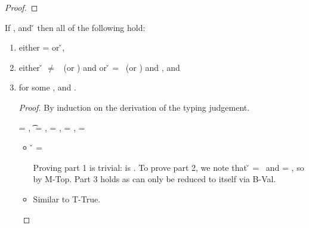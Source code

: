  \label{lemma:delta}
\begin{lemma}[Const]
\begin{proof}
\end{proof}
\end{lemma}

\begin{lemma}
If \judgement{\propenv{}}{\hastype{\e{}}{\t{}}}{\filterset{\thenprop{\prop{}}}{\elseprop{\prop{}}}}{\object{}},
\satisfies{\openv{}}{\propenv{}} 
and \opsem {\openv{}} {\e{}} {\v{}} 
then all of the following hold:
\begin{enumerate}
  \item either \object{} = \emptyobject{} or \inopenv {\openv{}} {\object{}} {\v{}},
  \item either \v{} $\not=$ \false\ (or \nil) and {\satisfies{\openv{}}{\thenprop{\prop{}}}} or 
               \v{}       = \false\ (or \nil) and {\satisfies{\openv{}}{\elseprop{\prop{}}}}, and
  \item \judgement{}{\hastype{\v{}}{\t{}}}{\filterset{\thenprop{\propp{}}}{\elseprop{\propp{}}}}{\objectp{}}
        for some \thenprop{\propp{}}, \elseprop{\propp{}} and {\objectp{}}.

\begin{proof}
By induction on the derivation of the typing judgement.

\begin{case}[T-True]
\e{} = \true, \t{} = \True, \thenprop{\prop{}} = \topprop{}, \elseprop{\prop{}} = \botprop{}, \object{} = \emptyobject{}

\begin{itemize}
  \item[] 
    \begin{subcase}[B-Val]
      \v{} = \true{}

Proving part 1 is trivial: \object{} is \emptyobject. 
To prove part 2, we note that \v{} = \true\ 
and \thenprop{\prop{}} = \topprop{}, so \satisfies{\openv{}}{\thenprop{\prop{}}} by M-Top.
Part 3 holds as \e{} can only be reduced to itself via B-Val.
\end{subcase}

\end{itemize}

\begin{case}[T-EmptyMap]

  \begin{itemize}
    \item[]
      \begin{subcase}[B-Val]
        Similar to T-True.
      \end{subcase}
  \end{itemize}
\end{case}


\end{case}
\end{proof}
\end{enumerate}
\end{lemma}
